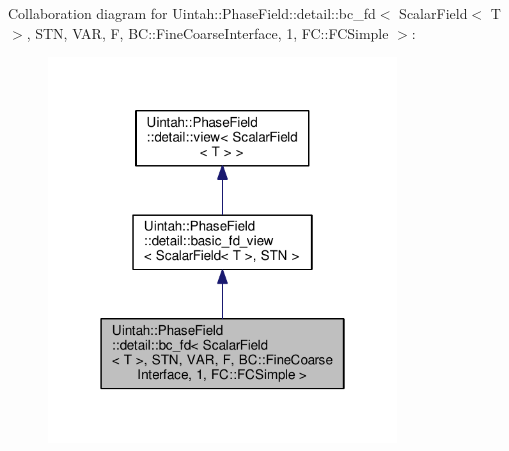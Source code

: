 Collaboration diagram for Uintah\+:\+:Phase\+Field\+:\+:detail\+:\+:bc\+\_\+fd$<$ Scalar\+Field$<$ T $>$, S\+TN, V\+AR, F, BC\+:\+:Fine\+Coarse\+Interface, 1, FC\+:\+:F\+C\+Simple $>$\+:\nopagebreak
\begin{figure}[H]
\begin{center}
\leavevmode
\includegraphics[width=262pt]{classUintah_1_1PhaseField_1_1detail_1_1bc__fd_3_01ScalarField_3_01T_01_4_00_01STN_00_01VAR_00_01b47c705a7b90eff5d5f481f5d9dbc972}
\end{center}
\end{figure}
